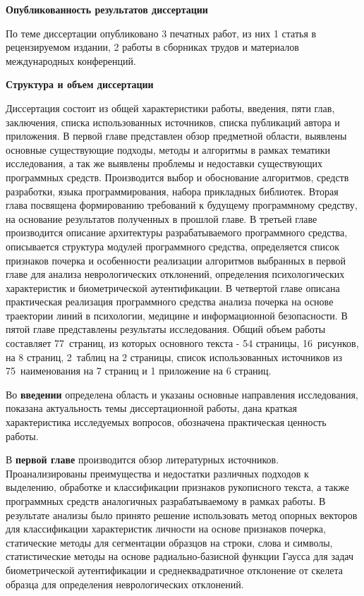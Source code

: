 \bigskip
\textbf{Опубликованность результатов диссертации}
\bigskip

По теме диссертации опубликовано 3 печатных работ, из них 1 статья в рецензируемом издании, 2 работы в сборниках трудов и материалов международных конференций.

\bigskip
\textbf{Структура и объем диссертации}
\bigskip

Диссертация состоит из общей характеристики работы, введения, пяти глав, заключения, списка использованных источников, списка публикаций автора и приложения. В первой главе представлен обзор предметной области, выявлены основные существующие подходы, методы и алгоритмы в рамках тематики исследования, а так же выявлены проблемы и недоставки существующих программных средств. Производится выбор и обоснование алгоритмов, средств разработки, языка программирования, набора прикладных библиотек. Вторая глава посвящена формированию требований к будущему программному средству, на основание результатов полученных в прошлой главе. В третьей главе производится описание архитектуры разрабатываемого программного средства, описывается структура модулей программного средства, определяется список признаков почерка и особенности реализации алгоритмов выбранных в первой главе для анализа неврологических отклонений, определения психологических характеристик и биометрической аутентификации. В четвертой главе описана практическая реализация программного средства анализа почерка на основе траектории линий в психологии, медицине и информационной безопасности. В пятой главе представлены результаты исследования.
Общий объем работы составляет 77~страниц, из которых основного текста - 54 страницы, 16~рисунков, на 8 страниц, 2~таблиц на 2 страницы, список использованных источников из 75~наименования на 7 страниц и 1 приложение на 6 страниц.


Во \textbf{введении} определена область и указаны основные направления исследования, показана актуальность темы диссертационной работы, дана краткая характеристика исследуемых вопросов, обозначена практическая ценность работы.

В \textbf{первой главе} производится обзор литературных источников. Проанализированы преимущества и недостатки различных подходов к выделению, обработке и классификации признаков рукописного текста, а также программных средств аналогичных разрабатываемому в рамках работы. В результате анализы было принято решение использовать метод опорных векторов для классификации характеристик личности на основе признаков почерка, статические методы для сегментации образцов на строки, слова и символы, статистические методы на основе радиально-базисной функции Гаусса для задач биометрической аутентификации и среднеквадратичное отклонение от скелета образца для определения неврологических отклонений.


